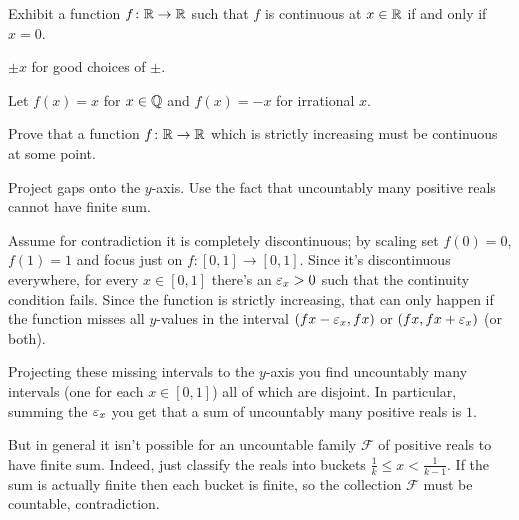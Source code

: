 \begin{problem}
	Exhibit a function $f \colon \mathbb R \to \mathbb R$ such that
	$f$ is continuous at $x \in \mathbb R$ if and only if $x=0$.
	\begin{hint}
		$\pm x$ for good choices of $\pm$.
	\end{hint}
	\begin{sol}
		Let $f(x) = x$ for $x \in \mathbb Q$ and $f(x) = -x$ for irrational $x$.
	\end{sol}
\end{problem}

\begin{problem}
	\yod
	Prove that a function $f \colon \mathbb R \to \mathbb R$ which is strictly increasing
	must be continuous at some point.
	\begin{hint}
		Project gaps onto the $y$-axis.
		Use the fact that uncountably many positive reals cannot have finite sum.
	\end{hint}
	\begin{sol}
		Assume for contradiction it is completely discontinuous;
		by scaling set $f(0) = 0$, $f(1) = 1$ and focus just on $f : [0,1] \to [0,1]$.
		Since it's discontinuous everywhere,
		for every $x \in [0,1]$ there's an $\varepsilon_x > 0$
		such that the continuity condition fails.
		Since the function is strictly increasing,
		that can only happen if the
		function misses all $y$-values in the interval
		$(fx-\varepsilon_x, fx)$ or $(fx, fx+\varepsilon_x)$ (or both).

		Projecting these missing intervals to the $y$-axis you find uncountably
		many intervals (one for each $x \in [0,1]$) all of which are disjoint.
		In particular, summing the $\varepsilon_x$ you get that a sum of uncountably
		many positive reals is $1$.

		But in general it isn't possible for an uncountable family $\mathcal F$
		of positive reals to have finite sum.
		Indeed, just classify the reals into buckets $\frac1k \le x < \frac1{k-1}$.
		If the sum is actually finite then each bucket is finite,
		so the collection $\mathcal F$ must be countable, contradiction.
	\end{sol}
\end{problem}
